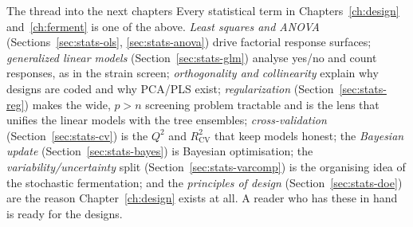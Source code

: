\begin{keybox}{The thread into the next chapters}
Every statistical term in Chapters~\ref{ch:design} and~\ref{ch:ferment} is one
of the above. \emph{Least squares and ANOVA} (Sections~\ref{sec:stats-ols},
\ref{sec:stats-anova}) drive factorial response surfaces; \emph{generalized
linear models} (Section~\ref{sec:stats-glm}) analyse yes/no and count responses,
as in the strain screen; \emph{orthogonality and collinearity} explain why
designs are coded and why PCA/PLS exist; \emph{regularization}
(Section~\ref{sec:stats-reg}) makes the wide, $p>n$ screening problem tractable
and is the lens that unifies the linear models with the tree ensembles;
\emph{cross-validation} (Section~\ref{sec:stats-cv}) is the $Q^2$ and
$R^2_{\mathrm{CV}}$ that keep models honest; the \emph{Bayesian update}
(Section~\ref{sec:stats-bayes}) is Bayesian optimisation; the
\emph{variability/uncertainty} split (Section~\ref{sec:stats-varcomp}) is the
organising idea of the stochastic fermentation; and the \emph{principles of
design} (Section~\ref{sec:stats-doe}) are the reason
Chapter~\ref{ch:design} exists at all. A reader who has these in hand is ready
for the designs.
\end{keybox}
